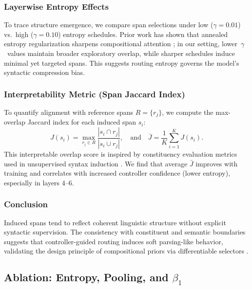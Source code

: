 \subsubsection*{Layerwise Entropy Effects}

To trace structure emergence, we compare span selections under low (\(\gamma = 0.01\)) vs.\ high (\(\gamma = 0.10\)) entropy schedules. Prior work has shown that annealed entropy regularization sharpens compositional attention \cite{pereyra2017regularizing, gupta2022molt}; in our setting, lower~\(\gamma\)~values maintain broader exploratory overlap, while sharper schedules induce minimal yet targeted spans. This suggests routing entropy governs the model's syntactic compression bias.

\subsubsection*{Interpretability Metric (Span Jaccard Index)}

To quantify alignment with reference spans \(R = \{r_j\}\), we compute the max-overlap Jaccard index for each induced span \(s_i\):
\[
J(s_i) = \max_{r_j \in R} \frac{|s_i \cap r_j|}{|s_i \cup r_j|}, \quad \text{and} \quad \bar{J} = \frac{1}{K} \sum_{i=1}^K J(s_i).
\]
This interpretable overlap score is inspired by constituency evaluation metrics used in unsupervised syntax induction \cite{kim2019unsupervised, naradowsky2021structured}. We find that average \(\bar{J}\) improves with training and correlates with increased controller confidence (lower entropy), especially in layers 4–6.

\subsubsection*{Conclusion}

Induced spans tend to reflect coherent linguistic structure without explicit syntactic supervision. The consistency with constituent and semantic boundaries suggests that controller-guided routing induces soft parsing-like behavior, validating the design principle of compositional priors via differentiable selectors \cite{li2021prefix, tay2020sparse}.











\subsection{Ablation: Entropy, Pooling, and \texorpdfstring{$\beta_1$}{β₁}}
\label{sec:ablation}

